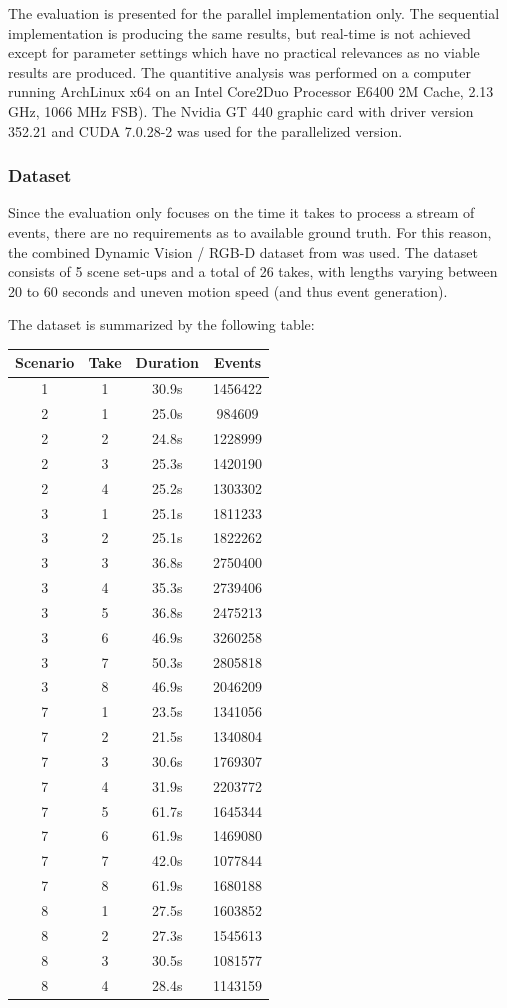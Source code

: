 The evaluation is presented for the parallel implementation only.
The sequential implementation is producing the same results, but real-time is not achieved except for parameter settings which have no practical relevances as no viable results are produced.
The quantitive analysis was performed on a computer running ArchLinux x64 on an Intel Core2Duo Processor E6400 2M Cache, 2.13 GHz, 1066 MHz FSB).
The Nvidia GT 440 graphic card with driver version 352.21 and CUDA 7.0.28-2 was used for the parallelized version.

\subsubsection{Dataset}
Since the evaluation only focuses on the time it takes to process a stream of events, there are no requirements as to available ground truth.
For this reason, the combined Dynamic Vision / RGB-D dataset from \cite{weikersdorfer2014event} was used.
The dataset consists of 5 scene set-ups and a total of 26 takes, with lengths varying between 20 to 60 seconds and uneven motion speed (and thus event generation).

The dataset is summarized by the following table:\\
\begin{center}
\begin{tabular}{ | c | c | c | c | }
	\hline		
	Scenario & Take & Duration & Events\\
	\hline	
	\hline	
	1 & 1 & 30.9s & 1456422\\
	2 & 1 & 25.0s & 984609\\
	2 & 2 & 24.8s & 1228999\\
	2 & 3 & 25.3s & 1420190\\
	2 & 4 & 25.2s & 1303302\\
	3 & 1 & 25.1s & 1811233\\
	3 & 2 & 25.1s & 1822262\\
	3 & 3 & 36.8s & 2750400\\
	3 & 4 & 35.3s & 2739406\\
	3 & 5 & 36.8s & 2475213\\
	3 & 6 & 46.9s & 3260258\\
	3 & 7 & 50.3s & 2805818\\
	3 & 8 & 46.9s & 2046209\\
	7 & 1 & 23.5s & 1341056\\
	7 & 2 & 21.5s & 1340804\\
	7 & 3 & 30.6s & 1769307\\
	7 & 4 & 31.9s & 2203772\\
	7 & 5 & 61.7s & 1645344\\
	7 & 6 & 61.9s & 1469080\\
	7 & 7 & 42.0s & 1077844\\
	7 & 8 & 61.9s & 1680188\\
	8 & 1 & 27.5s & 1603852\\
	8 & 2 & 27.3s & 1545613\\
	8 & 3 & 30.5s & 1081577\\
	8 & 4 & 28.4s & 1143159\\                     
	\hline			
\end{tabular}
\end{center}



